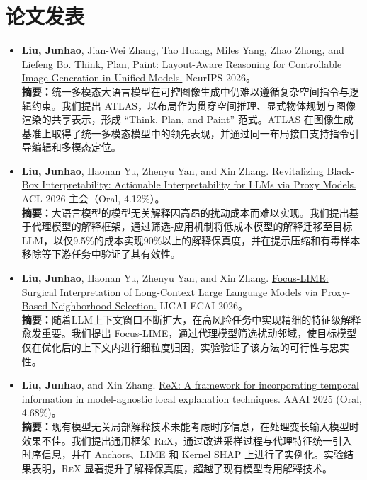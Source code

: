 \documentclass[letterpaper,11pt]{article}
\begin{document}
\section{论文发表}
\begin{itemize}[leftmargin=*]
    \item \textbf{Liu, Junhao}, Jian-Wei Zhang, Tao Huang, Miles Yang, Zhao Zhong, and Liefeng Bo. \href{https://arxiv.org/abs/2607.16409}{Think, Plan, Paint: Layout-Aware Reasoning for Controllable Image Generation in Unified Models.} NeurIPS 2026。\vspace{0.2cm}\\
        {\small \textbf{摘要：}统一多模态大语言模型在可控图像生成中仍难以遵循复杂空间指令与逻辑约束。我们提出 ATLAS，以布局作为贯穿空间推理、显式物体规划与图像渲染的共享表示，形成 ``Think, Plan, and Paint'' 范式。ATLAS 在图像生成基准上取得了统一多模态模型中的领先表现，并通过同一布局接口支持指令引导编辑和多模态定位。}

    \item \textbf{Liu, Junhao}, Haonan Yu, Zhenyu Yan, and Xin Zhang. \href{https://aclanthology.org/2026.acl-long.220/}{Revitalizing Black-Box Interpretability: Actionable Interpretability for LLMs via Proxy Models.} ACL 2026 主会（Oral, 4.12\%）。\vspace{0.2cm}\\
    {\small \textbf{摘要：}大语言模型的模型无关解释因高昂的扰动成本而难以实现。我们提出基于代理模型的解释框架，通过筛选-应用机制将低成本模型的解释迁移至目标LLM，以仅9.5\%的成本实现90\%以上的解释保真度，并在提示压缩和有毒样本移除等下游任务中验证了其有效性。}

    \item \textbf{Liu, Junhao}, Haonan Yu, Zhenyu Yan, and Xin Zhang. \href{https://arxiv.org/abs/2602.04607}{Focus-LIME: Surgical Interpretation of Long-Context Large Language Models via Proxy-Based Neighborhood Selection.} IJCAI-ECAI 2026。\vspace{0.2cm}\\
        {\small \textbf{摘要：}随着LLM上下文窗口不断扩大，在高风险任务中实现精细的特征级解释愈发重要。我们提出 Focus-LIME，通过代理模型筛选扰动邻域，使目标模型仅在优化后的上下文内进行细粒度归因，实验验证了该方法的可行性与忠实性。}

    \item \textbf{Liu, Junhao}, and Xin Zhang. \href{https://ojs.aaai.org/index.php/AAAI/article/view/34079}{ReX: A framework for incorporating temporal information in model-agnostic local explanation techniques.} AAAI 2025 (Oral, 4.68\%)。\vspace{0.2cm}\\
        {\small \textbf{摘要：}现有模型无关局部解释技术未能考虑时序信息，在处理变长输入模型时效果不佳。我们提出通用框架 \textsc{ReX}，通过改进采样过程与代理特征统一引入时序信息，并在 Anchors、LIME 和 Kernel SHAP 上进行了实例化。实验结果表明，\textsc{ReX} 显著提升了解释保真度，超越了现有模型专用解释技术。}


\end{itemize}
\end{document}
